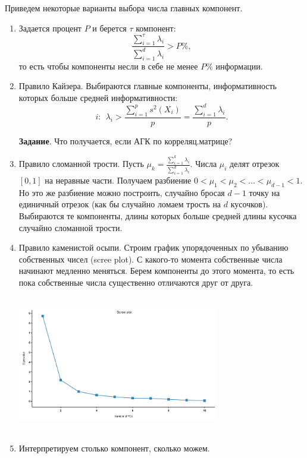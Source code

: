 \documentclass[specialist, 12pt,
subf, %
href, colorlinks=true,
substylefile = spbu.rtx,
]{disser}
\begin{document}
Приведем некоторые варианты выбора числа главных компонент.

\begin{enumerate}
\item Задается процент $P$ и берется $\tau$ компонент:
\begin{equation*}
\frac{\sum\limits_{i=1}^\tau \lambda_i}{\sum\limits_{i=1}^d \lambda_i} > P\%,
\end{equation*}
то есть чтобы компоненты несли в себе не менее $P\%$ информации.

\item Правило Кайзера.
Выбираются главные компоненты, информативность которых больше средней информативности:
\begin{equation*}
i:~~\lambda_i>\frac{\sum\limits_{i=1}^p s^2(X_i)}{p} = \frac{\sum\limits_{i=1}^d \lambda_i}{p}.
\end{equation*}

\textbf{Задание}. Что получается, если АГК по корреляц.матрице?

\item Правило сломанной трости. Пусть $\mu_k = \frac{\sum\limits_{i=1}^k \lambda_i}{\sum\limits_{i=1}^d \lambda_i}$. Числа $\mu_i$ делят отрезок $[0,1]$ на неравные части. Получаем разбиение $0<\mu_1<\mu_2<\ldots<\mu_{d-1}<1$. Но это же разбиение можно построить, случайно бросая $d-1$ точку на единичный отрезок (как бы случайно ломаем трость на $d$ кусочков). Выбираются те компоненты, длины которых больше средней длины кусочка случайно сломанной трости.

\item Правило каменистой осыпи. Строим график упорядоченных по убыванию собственных чисел (scree plot). С какого-то момента собственные числа начинают медленно меняться. Берем компоненты до этого момента, то есть пока собственные числа существенно отличаются друг от друга.

	\begin{center}
	\begin{minipage}{0.51\linewidth}
		\centering
		\includegraphics[width=250pt, height=170pt]{Scree}
	\end{minipage}
\end{center}

\item Интерпретируем столько компонент, сколько можем.
\end{enumerate}
\end{document}
